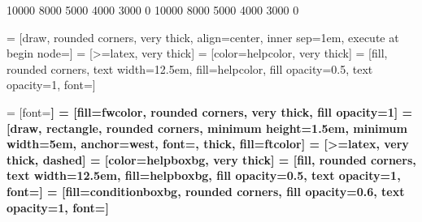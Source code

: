 \setlength{\intextsep}{25pt}

 10000 8000 5000 4000 3000 0 %
 10000 8000 5000 4000 3000 0 %
\raggedbottom

\usepackage{tikz}
\usetikzlibrary{arrows, positioning, fit, backgrounds, calc}

\usepackage{pgfplots}
\pgfplotsset{compat=newest}

 
 
 
 = [draw, rounded corners, very thick, align=center, inner 
sep=1em, execute at begin node=\setlength{\baselineskip}{2em}] 
 = [>=latex, very thick] 
 = [color=helpcolor, very thick] 
 = [fill, rounded corners, text width=12.5em, 
fill=helpcolor, fill opacity=0.5, text opacity=1, font=\small] 




 = [font=\bf\ttfamily]
 = [fill=fwcolor, rounded corners, very thick, fill opacity=1]
 = [draw, rectangle, rounded corners, minimum height=1.5em, minimum width=5em, anchor=west, font=\footnotesize\ttfamily, thick, fill=ftcolor]
 = [>=latex, very thick, dashed]
 = [color=helpboxbg, very thick]
 = [fill, rounded corners, text width=12.5em, fill=helpboxbg, fill opacity=0.5, text opacity=1, font=\small]
 = [fill=conditionboxbg, rounded corners, fill opacity=0.6, text opacity=1, font=\footnotesize]



\usepackage{hyperref}
\hypersetup{
    colorlinks=true,
    linkcolor=black,
    filecolor=magenta,      
    urlcolor=blue,
}

